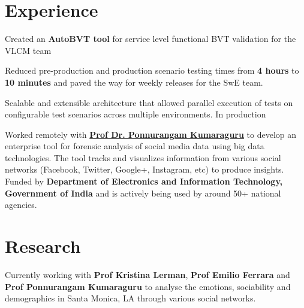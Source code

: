 \documentclass[]{deedy-resume-openfont}
\begin{document}
\begin{minipage}[t]{0.66\textwidth} 


\section{Experience}
\vspace{\topsep} %
\begin{tightemize}
\item Created an \textbf{AutoBVT tool} for service level functional BVT validation for the VLCM team
\item Reduced pre-production and production scenario testing times from \textbf{4 hours} to \textbf{10 minutes} and paved the way for weekly releases for the SwE team.
\item
Scalable and extensible architecture that allowed parallel execution of tests on configurable test scenarios across multiple environments. In production
\end{tightemize}
\sectionsep

Worked remotely with \textbf{\href{http://precog.iiitd.edu.in/people/pk/Home.html}{Prof Dr. Ponnurangam Kumaraguru}} to develop an enterprise tool for forensic analysis of social media data using big data technologies. The tool tracks and visualizes information from various social networks (Facebook, Twitter, Google+, Instagram, etc) to produce insights. Funded by \textbf{Department of Electronics and Information Technology, Government of India} and is actively being used by around 50+ national agencies.



\section{Research}
Currently working with \textbf{Prof Kristina Lerman}, \textbf{Prof Emilio Ferrara} and \textbf{Prof Ponnurangam Kumaraguru} to analyse the emotions, sociability and demographics in Santa Monica, LA through various social networks.
\sectionsep


\end{minipage}
\end{document}
